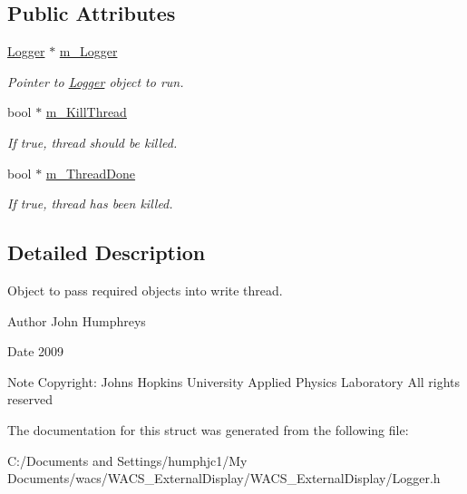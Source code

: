 \subsection*{Public Attributes}
\begin{DoxyCompactItemize}
\item 
\hypertarget{struct_logger_thread_params_ab27ff4270e99ddbc9c77c56a739f3e20}{
\hyperlink{class_logger}{Logger} $\ast$ \hyperlink{struct_logger_thread_params_ab27ff4270e99ddbc9c77c56a739f3e20}{m\_\-Logger}}
\label{struct_logger_thread_params_ab27ff4270e99ddbc9c77c56a739f3e20}

\begin{DoxyCompactList}\small\item\em Pointer to \hyperlink{class_logger}{Logger} object to run. \end{DoxyCompactList}\item 
\hypertarget{struct_logger_thread_params_a9ba1826fd0f31f34a3cff91e772ebee3}{
bool $\ast$ \hyperlink{struct_logger_thread_params_a9ba1826fd0f31f34a3cff91e772ebee3}{m\_\-KillThread}}
\label{struct_logger_thread_params_a9ba1826fd0f31f34a3cff91e772ebee3}

\begin{DoxyCompactList}\small\item\em If true, thread should be killed. \end{DoxyCompactList}\item 
\hypertarget{struct_logger_thread_params_ac9663b1ac1300e8c8f4721c5f57c8742}{
bool $\ast$ \hyperlink{struct_logger_thread_params_ac9663b1ac1300e8c8f4721c5f57c8742}{m\_\-ThreadDone}}
\label{struct_logger_thread_params_ac9663b1ac1300e8c8f4721c5f57c8742}

\begin{DoxyCompactList}\small\item\em If true, thread has been killed. \end{DoxyCompactList}\end{DoxyCompactItemize}


\subsection{Detailed Description}
Object to pass required objects into write thread. 

\begin{DoxyAuthor}{Author}
John Humphreys 
\end{DoxyAuthor}
\begin{DoxyDate}{Date}
2009 
\end{DoxyDate}
\begin{DoxyNote}{Note}
Copyright: Johns Hopkins University Applied Physics Laboratory All rights reserved 
\end{DoxyNote}


The documentation for this struct was generated from the following file:\begin{DoxyCompactItemize}
\item 
C:/Documents and Settings/humphjc1/My Documents/wacs/WACS\_\-ExternalDisplay/WACS\_\-ExternalDisplay/Logger.h\end{DoxyCompactItemize}
